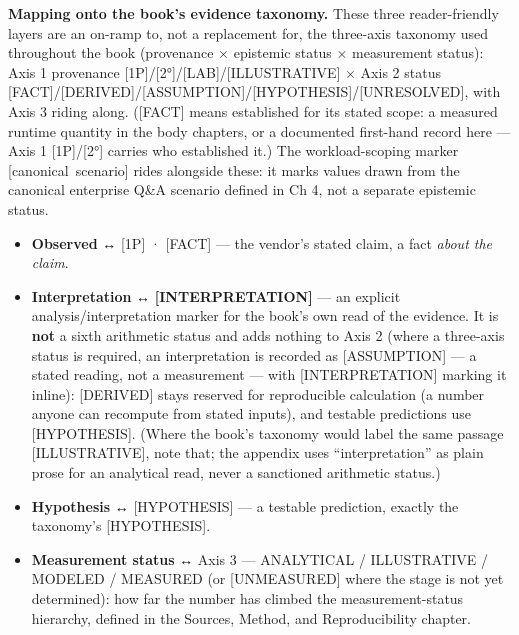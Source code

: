 \textbf{Mapping onto the book's evidence taxonomy.} These three
reader-friendly layers are an on-ramp to, not a replacement for, the
three-axis taxonomy used throughout the book (provenance × epistemic
status × measurement status): Axis 1 provenance
\mbox{{[}1P{]}}/\mbox{{[}2°{]}}/\mbox{{[}LAB{]}}/\mbox{{[}ILLUSTRATIVE{]}} × Axis 2 status
\mbox{{[}FACT{]}}/\mbox{{[}DERIVED{]}}/\mbox{{[}ASSUMPTION{]}}/\mbox{{[}HYPOTHESIS{]}}/\mbox{{[}UNRESOLVED{]}},
with Axis 3 riding along. (\mbox{{[}FACT{]}} means established for its stated
scope: a measured runtime quantity in the body chapters, or a documented
first-hand record here --- Axis 1 \mbox{{[}1P{]}}/\mbox{{[}2°{]}} carries who
established it.) The workload-scoping marker \mbox{{[}canonical scenario{]}}
rides alongside these: it marks values drawn from the canonical
enterprise Q\&A scenario defined in Ch 4, not a separate epistemic
status.

\begin{itemize}
\tightlist
\item
  \textbf{Observed} ↔ \mbox{{[}1P{]}} · \mbox{{[}FACT{]}} --- the vendor's stated
  claim, a fact \emph{about the claim}.
\item
  \textbf{Interpretation} ↔ \textbf{\mbox{{[}INTERPRETATION{]}}} --- an
  explicit analysis/interpretation marker for the book's own read of the
  evidence. It is \textbf{not} a sixth arithmetic status and adds
  nothing to Axis 2 (where a three-axis status is required, an
  interpretation is recorded as \mbox{{[}ASSUMPTION{]}} --- a stated reading,
  not a measurement --- with \mbox{{[}INTERPRETATION{]}} marking it inline):
  \mbox{{[}DERIVED{]}} stays reserved for reproducible calculation (a number
  anyone can recompute from stated inputs), and testable predictions use
  \mbox{{[}HYPOTHESIS{]}}. (Where the book's taxonomy would label the same
  passage \mbox{{[}ILLUSTRATIVE{]}}, note that; the appendix uses
  ``interpretation'' as plain prose for an analytical read, never a
  sanctioned arithmetic status.)
\item
  \textbf{Hypothesis} ↔ \mbox{{[}HYPOTHESIS{]}} --- a testable prediction,
  exactly the taxonomy's \mbox{{[}HYPOTHESIS{]}}.
\item
  \textbf{Measurement status} ↔ Axis 3 --- ANALYTICAL / ILLUSTRATIVE /
  MODELED / MEASURED (or \mbox{{[}UNMEASURED{]}} where the stage is not yet
  determined): how far the number has climbed the measurement-status
  hierarchy, defined in the Sources, Method, and Reproducibility
  chapter.
\end{itemize}

